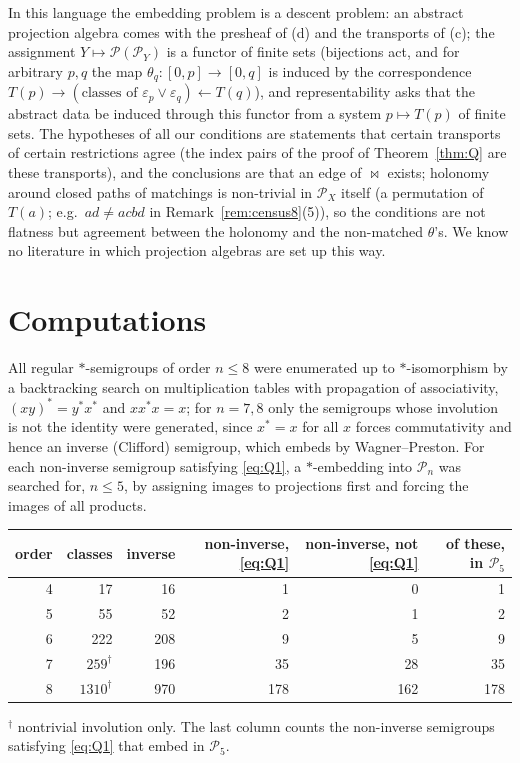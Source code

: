 \documentclass[11pt]{amsart}
\theoremstyle{definition}
\renewcommand{\P}{\mathcal{P}}
\begin{document}
In this language the embedding problem is a descent problem: an abstract projection algebra comes with the presheaf of (d) and the transports of (c); the assignment $Y\mapsto\P(\P_Y)$ is a functor of finite sets (bijections act, and for arbitrary $p,q$ the map $\theta_q\colon[0,p]\to[0,q]$ is induced by the correspondence $T(p)\to(\text{classes of }\varepsilon_p\vee\varepsilon_q)\leftarrow T(q)$), and representability asks that the abstract data be induced through this functor from a system $p\mapsto T(p)$ of finite sets. The hypotheses of all our conditions are statements that certain transports of certain restrictions agree (the index pairs of the proof of Theorem~\ref{thm:Q} are these transports), and the conclusions are that an edge of $\bowtie$ exists; holonomy around closed paths of matchings is non-trivial in $\P_X$ itself (a permutation of $T(a)$; e.g.\ $ad\ne acbd$ in Remark~\ref{rem:census8}(5)), so the conditions are not flatness but agreement between the holonomy and the non-matched $\theta$'s. We know no literature in which projection algebras are set up this way.

\section{Computations}\label{sec:comp}

All regular $*$-semigroups of order $n\le8$ were enumerated up to $*$-isomorphism by a backtracking search on multiplication tables with propagation of associativity, $(xy)^*=y^*x^*$ and $xx^*x=x$; for $n=7,8$ only the semigroups whose involution is not the identity were generated, since $x^*=x$ for all $x$ forces commutativity and hence an inverse (Clifford) semigroup, which embeds by Wagner--Preston. For each non-inverse semigroup satisfying \eqref{eq:Q1}, a $*$-embedding into $\P_n$ was searched for, $n\le5$, by assigning images to projections first and forcing the images of all products.

\begin{center}
\begin{tabular}{@{}rrrrrr@{}}
\toprule
order & classes & inverse & non-inverse, \eqref{eq:Q1} & non-inverse, not \eqref{eq:Q1} & of these, in $\P_5$\\
\midrule
4 & 17 & 16 & 1 & 0 & 1\\
5 & 55 & 52 & 2 & 1 & 2\\
6 & 222 & 208 & 9 & 5 & 9\\
7 & $259^{\dagger}$ & 196 & 35 & 28 & 35\\
8 & $1310^{\dagger}$ & 970 & 178 & 162 & 178\\
\bottomrule
\end{tabular}

\smallskip
{\small $^\dagger$ nontrivial involution only. The last column counts the non-inverse semigroups satisfying \eqref{eq:Q1} that embed in $\P_5$.}
\end{center}
\end{document}
